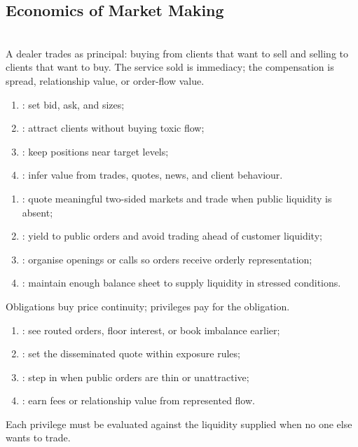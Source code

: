 \subsection{Economics of Market Making}

\begin{definition} \\
A dealer trades as principal: buying from clients that want to sell and selling to clients that want to buy. The service sold is immediacy; the compensation is spread, relationship value, or order-flow value.
\end{definition}

\begin{taxonomy} 
\begin{enumerate}[label=\roman*.]
\setlength{\itemsep}{0pt}
\item {}: set bid, ask, and sizes;
\item {}: attract clients without buying toxic flow;
\item {}: keep positions near target levels;
\item {}: infer value from trades, quotes, news, and client behaviour.
\end{enumerate}
\end{taxonomy}

\begin{taxonomy} 
\begin{enumerate}[label=\roman*.]
\setlength{\itemsep}{0pt}
\item {}: quote meaningful two-sided markets and trade when public liquidity is absent;
\item {}: yield to public orders and avoid trading ahead of customer liquidity;
\item {}: organise openings or calls so orders receive orderly representation;
\item {}: maintain enough balance sheet to supply liquidity in stressed conditions.
\end{enumerate}
Obligations buy price continuity; privileges pay for the obligation.
\end{taxonomy}

\begin{taxonomy} 
\begin{enumerate}[label=\roman*.]
\setlength{\itemsep}{0pt}
\item {}: see routed orders, floor interest, or book imbalance earlier;
\item {}: set the disseminated quote within exposure rules;
\item {}: step in when public orders are thin or unattractive;
\item {}: earn fees or relationship value from represented flow.
\end{enumerate}
Each privilege must be evaluated against the liquidity supplied when no one else wants to trade.
\end{taxonomy}

